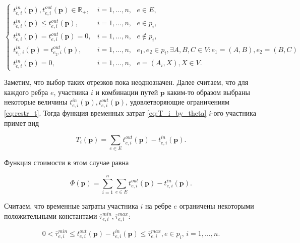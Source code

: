\documentclass[12pt, a4paper]{article}
\begin{document}
\begin{equation}
	\label{eq:restr_t}
	\begin{cases}
		t_{e, i}^{in}(\textbf{p}), t_{e, i}^{out}(\textbf{p}) \in \mathbb{R}_+,  & i = 1, \dots, n, \text{ } e \in E, \\
		t_{e, i}^{in}(\textbf{p}) \le t_{e, i}^{out}(\textbf{p}), & i = 1, \dots, n, \text{ } e \in p_i,  \\
		t_{e, i}^{in}(\textbf{p}) = t_{e, i}^{out}(\textbf{p}) = 0, & i = 1, \dots, n, \text{ } e \notin p_i, \\
		t_{e_1, i}^{in} (\textbf{p}) = t_{e_2, i}^{out} (\textbf{p}), & i = 1, \dots, n, \text{ } e_1, e_2 \in p_i, \exists A, B, C \in V: e_1 = (A, B), e_2 = (B, C)\\
		t_{e, i}^{in} (\textbf{p}) = 0, & i = 1, \dots, n, \text{ } e = (A_i, X), X \in V.
	\end{cases}
\end{equation}

Заметим, что выбор таких отрезков пока неоднозначен. Далее считаем, что для каждого ребра $e$, участника $i$ и комбинации путей $\textbf{p}$ каким-то образом выбраны некоторые величины $t_{e, i}^{in}(\textbf{p}), t_{e, i}^{out}(\textbf{p})$, удовлетворяющие ограничениям \eqref{eq:restr_t}. Тогда функция временных затрат \eqref{eq:T_i_by_theta} $i$-ого участника примет вид

\begin{equation}
	\label{eq:T_i_by_t}
	T_i(\textbf{p}) = \sum \limits_{e \in E} t_{e, i}^{out}(\textbf{p}) - t_{e, i}^{in}(\textbf{p}).
\end{equation}

Функция стоимости в этом случае равна 

\begin{equation}
	\label{eq:target_func}
	\Phi(\textbf{p}) =\sum \limits_{i = 1}^n \sum \limits_{e \in E} t_{e, i}^{out}(\textbf{p}) - t_{e, i}^{in}(\textbf{p}).
\end{equation}

Считаем, что временные затраты участника $i$ на ребре $e$ ограничены некоторыми положительными константами $\overline{\tau}_{e, i}^{min}, \overline{\tau}_{e, i}^{max}$:

\begin{equation}
	\label{eq:add_restr}
		0 < \overline{\tau}_{e, i}^{min} \le t_{e, i}^{out}(\textbf{p}) - t_{e, i}^{in}(\textbf{p}) \le \overline{\tau}_{e, i}^{max}, e \in p_i,\, i = 1, \dots, n.
\end{equation}
\end{document}
